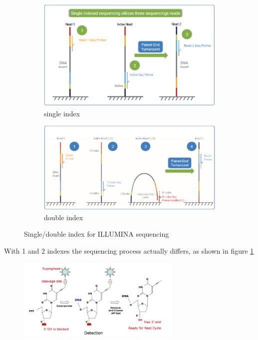 \begin{figure}[H]
    \centering
    
    \begin{subfigure}[b]{0.39\textwidth}
        \centering
        \includegraphics[width=\textwidth]{singleIndex}
        \caption{single index}
    \end{subfigure}
    \hfill
    \begin{subfigure}[b]{0.60\textwidth}
        \centering
        \includegraphics[width=\textwidth]{doubleIndex}
        \caption{double index}
    \end{subfigure}
    \caption{Single/double index for ILLUMINA sequencing}
    \label{singDoubInd}
\end{figure}

With 1 and 2 indexes the sequencing process actually differs, as shown in figure \ref{singDoubInd}


\begin{figure}[H]
\caption{}
\centering
\includegraphics[width=0.7\textwidth]{ILLUMINArev}
\label{ILLUMINArev}
\end{figure}

